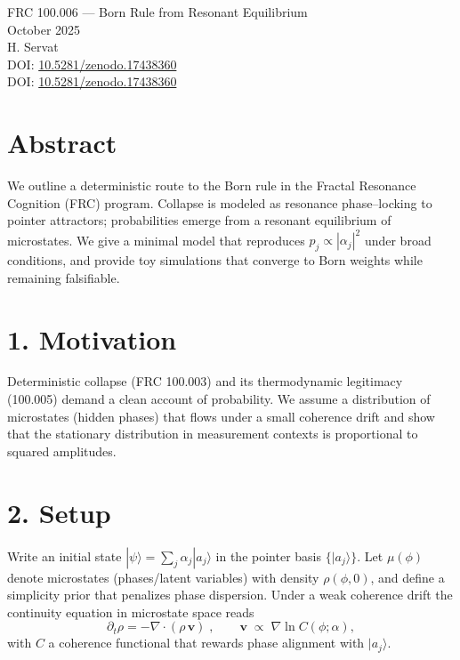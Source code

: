 \documentclass[10pt]{article}
\begin{document}
\begin{center}
{\Large FRC 100.006 — Born Rule from Resonant Equilibrium}\\
{\large October 2025}\\[4pt]
H. Servat
\\[4pt]
\small DOI: \href{https://doi.org/10.5281/zenodo.17438360}{10.5281/zenodo.17438360}
\\[4pt]
\small DOI: \href{https://doi.org/10.5281/zenodo.17438360}{10.5281/zenodo.17438360}
\end{center}

\section*{Abstract}
We outline a deterministic route to the Born rule in the Fractal Resonance Cognition (FRC) program. Collapse is modeled as resonance phase--locking to pointer attractors; probabilities emerge from a resonant equilibrium of microstates. We give a minimal model that reproduces $p_j\!\propto\!|\alpha_j|^2$ under broad conditions, and provide toy simulations that converge to Born weights while remaining falsifiable.

\section*{1. Motivation}
Deterministic collapse (FRC 100.003) and its thermodynamic legitimacy (100.005) demand a clean account of probability. We assume a distribution of microstates (hidden phases) that flows under a small coherence drift and show that the stationary distribution in measurement contexts is proportional to squared amplitudes.

\section*{2. Setup}
Write an initial state $|\psi\rangle=\sum_j \alpha_j |a_j\rangle$ in the pointer basis $\{|a_j\rangle\}$. Let $\mu(\phi)$ denote microstates (phases/latent variables) with density $\rho(\phi,0)$, and define a simplicity prior that penalizes phase dispersion. Under a weak coherence drift the continuity equation in microstate space reads
\begin{equation}
 \partial_t \rho = -\nabla\!\cdot (\rho\,\mathbf{v})\; ,\qquad \mathbf{v} \;\propto\; \nabla \ln C(\phi;\alpha),
\end{equation}
with $C$ a coherence functional that rewards phase alignment with $|a_j\rangle$.
\end{document}
